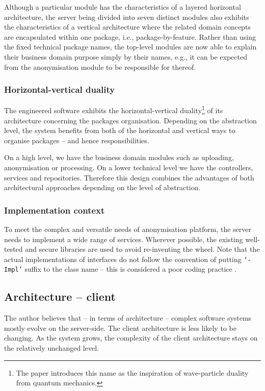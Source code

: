 \documentclass[a4paper,twoside,12pt]{book}
\begin{document}
Although a particular module has the characteristics of a layered horizontal architecture, the server being divided into seven distinct modules also exhibits the characteristics of a vertical architecture \cite{bib:clean_architecture} where the related domain concepts are encapsulated within one package, i.e., package-by-feature. Rather than using the fixed technical package names, the top-level modules are now able to explain their business domain purpose simply by their names, e.g., it can be expected from the anonymisation module to be responsible for thereof.

\subsubsection{Horizontal-vertical duality}

The engineered software exhibits the horizontal-vertical duality\footnote{The paper introduces this name as the inspiration of wave-particle duality from quantum mechanics.} of its architecture concerning the packages organisation. Depending on the abstraction level, the system benefits from both of the horizontal and vertical ways to organise packages -- and hence responsibilities.

On a high level, we have the business domain modules such as uploading, anonymisation or processing. On a lower technical level we have the controllers, services and repositories. Therefore this design combines the advantages of both architectural approaches depending on the level of abstraction.


\subsubsection{Implementation context}

To meet the complex and versatile needs of anonymisation platform, the server needs to implement a wide range of services. Wherever possible, the existing well-tested and secure libraries are used to avoid re-inventing the wheel. Note that the actual implementations of interfaces do not follow the convention of putting \texttt{`-Impl'} suffix to the class name -- this is considered a poor coding practice \cite{bib:clean_architecture}.

\subsection{Architecture -- client}
 
The author believes that -- in terms of architecture -- complex software systems mostly evolve on the server-side. The client architecture is less likely to be changing. As the system grows, the complexity of the client architecture stays on the relatively unchanged level.
\end{document}
